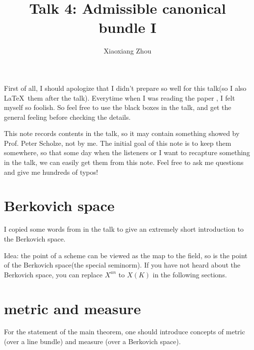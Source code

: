 \documentclass[reqno,11pt]{amsart}
\numberwithin{equation}{section}
\theoremstyle{plain}
\theoremstyle{plain}
\numberwithin{equation}{section}
\theoremstyle{remark}
\begin{document}
\date{}

\title
{Talk 4: Admissible canonical bundle I
}


\author{Xiaoxiang Zhou}
\address{School of Mathematical Sciences\\
University of Bonn\\
Bonn, 53115\\ Germany\\} 



\setcounter{tocdepth}{1}
\maketitle
\tableofcontents

First of all, I should apologize that I didn't prepare so well for this talk(so I also \LaTeX$\,$ them after the talk). Everytime when I was reading the paper \cite{yuan2021arithmetic}, I felt myself so foolish. So feel free to use the black boxes in the talk, and get the general feeling before checking the details.

This note records contents in the talk, so it may contain something showed by Prof. Peter Scholze, not by me. The initial goal of this note is to keep them somewhere, so that some day when the listeners or I want to recapture something in the talk, we can easily get them from this note. Feel free to ask me questions and give me hundreds of typos!

\section{Berkovich space}

I copied some words from \cite[3.1.1]{yuan2021adelic} in the talk to give an extremely short introduction to the Berkovich space. 

Idea: the point of a scheme can be viewed as the map to the field, so is the point of the Berkovich space(the special seminorm). If you have not heard about the Berkovich space, you can replace $X^{an}$ to $X(K)$ in the following sections.

\section{metric and measure}
For the statement of the main theorem, one should introduce concepts of metric (over a line bundle) and measure (over a Berkovich space).
\end{document}
